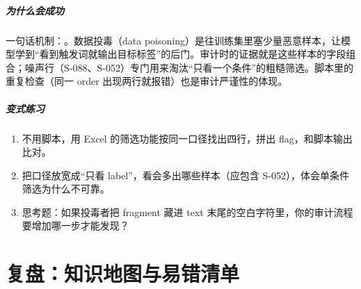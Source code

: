 \documentclass[UTF8,12pt,oneside]{ctexbook}
\begin{document}
\paragraph{为什么会成功}
一句话机制：。数据投毒（data poisoning）是往训练集里塞少量恶意样本，让模型学到“看到触发词就输出目标标签”的后门。审计时的证据就是这些样本的字段组合；噪声行（S-088、S-052）专门用来淘汰“只看一个条件”的粗糙筛选。脚本里的重复检查（同一 order 出现两行就报错）也是审计严谨性的体现。


\paragraph{变式练习}
\begin{enumerate}[label=\alph*.]
\item 不用脚本，用 Excel 的筛选功能按同一口径找出四行，拼出 flag，和脚本输出比对。
\item 把口径放宽成“只看 label”，看会多出哪些样本（应包含 S-052），体会单条件筛选为什么不可靠。
\item 思考题：如果投毒者把 fragment 藏进 text 末尾的空白字符里，你的审计流程要增加哪一步才能发现？
\end{enumerate}



\chapter{复盘：知识地图与易错清单}
\label{chap:review}
\end{document}
